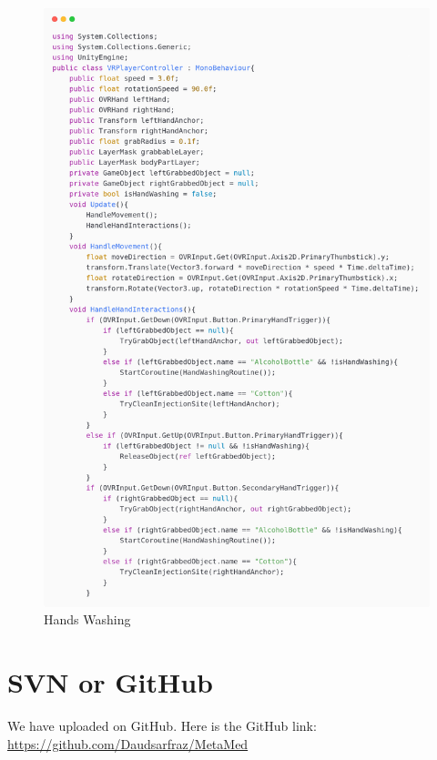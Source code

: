 \newpage
\begin{figure}[h] 
	\centering
	\includegraphics[width=1\textwidth, height=0.7\textheight]{Images/cleaning1.png}
	\caption{Hands Washing}
	\label{fig:Hands Washing}
\end{figure}


\section{SVN or GitHub}
We have uploaded on GitHub. Here is the GitHub link: \\
\href{https://github.com/Daudsarfraz/MetaMed}{https://github.com/Daudsarfraz/MetaMed}